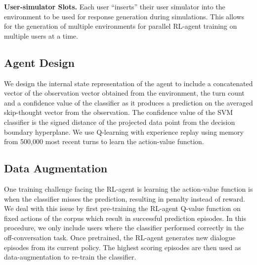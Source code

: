\noindent \textbf{ User-simulator Slots. } Each user “inserts” their user simulator 
into the environment to be used for response generation during simulations. 
This allows for the generation of multiple environments for parallel RL-agent training on multiple users at a time.


\subsection{ Agent Design }
We design the internal state representation of the agent to include a concatenated vector of 
the observation vector obtained from the environment, the turn count and a confidence 
value of the classifier as it produces a prediction on the averaged skip-thought vector from the observation. 
The confidence value of the SVM classifier is the signed distance of the projected data point from the 
decision boundary hyperplane. We use Q-learning with experience replay using memory from 500,000 
most recent turns to learn the action-value function. 



\subsection{ Data Augmentation }
One training challenge facing the RL-agent is learning the action-value function is 
when the classifier misses the prediction, resulting in penalty instead of reward. 
We deal with this issue by first pre-training the RL-agent Q-value function on fixed actions of the corpus 
which result in successful prediction episodes. In this procedure, we only include users where the classifier 
performed correctly in the off-conversation task. Once pretrained, 
the RL-agent generates new dialogue episodes from its current policy. 
The highest scoring episodes are then used as data-augmentation to re-train the classifier. 


